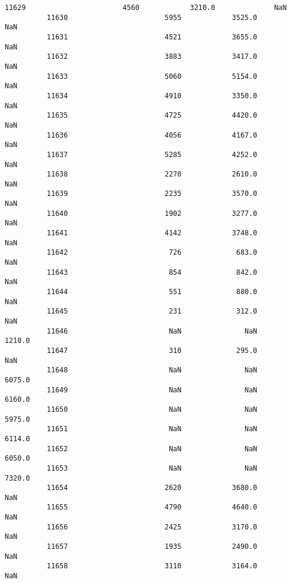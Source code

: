 \documentclass[11pt]{article}
\begin{document}
\begin{Verbatim}[commandchars=\\\{\}]
          11629                       4560            3210.0              NaN   
          11630                       5955            3525.0              NaN   
          11631                       4521            3655.0              NaN   
          11632                       3883            3417.0              NaN   
          11633                       5060            5154.0              NaN   
          11634                       4910            3350.0              NaN   
          11635                       4725            4420.0              NaN   
          11636                       4056            4167.0              NaN   
          11637                       5285            4252.0              NaN   
          11638                       2270            2610.0              NaN   
          11639                       2235            3570.0              NaN   
          11640                       1902            3277.0              NaN   
          11641                       4142            3748.0              NaN   
          11642                        726             683.0              NaN   
          11643                        854             842.0              NaN   
          11644                        551             880.0              NaN   
          11645                        231             312.0              NaN   
          11646                        NaN               NaN           1210.0   
          11647                        310             295.0              NaN   
          11648                        NaN               NaN           6075.0   
          11649                        NaN               NaN           6160.0   
          11650                        NaN               NaN           5975.0   
          11651                        NaN               NaN           6114.0   
          11652                        NaN               NaN           6050.0   
          11653                        NaN               NaN           7320.0   
          11654                       2620            3680.0              NaN   
          11655                       4790            4640.0              NaN   
          11656                       2425            3170.0              NaN   
          11657                       1935            2490.0              NaN   
          11658                       3110            3164.0              NaN   
          

\end{Verbatim}
\end{document}
